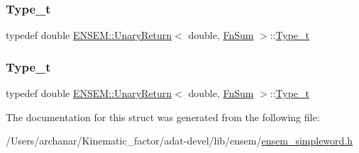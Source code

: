 \mbox{\label{structENSEM_1_1UnaryReturn_3_01double_00_01FnSum_01_4_ad107c064fb27f30146a624a7378978bb}} 
\subsubsection{\texorpdfstring{Type\_t}{Type\_t}\hspace{0.1cm}{\footnotesize\ttfamily [2/3]}}
{\footnotesize\ttfamily typedef double \mbox{\hyperlink{structENSEM_1_1UnaryReturn}{E\+N\+S\+E\+M\+::\+Unary\+Return}}$<$ double, \mbox{\hyperlink{structENSEM_1_1FnSum}{Fn\+Sum}} $>$\+::\mbox{\hyperlink{structENSEM_1_1UnaryReturn_3_01double_00_01FnSum_01_4_ad107c064fb27f30146a624a7378978bb}{Type\+\_\+t}}}

\mbox{\label{structENSEM_1_1UnaryReturn_3_01double_00_01FnSum_01_4_ad107c064fb27f30146a624a7378978bb}} 
\subsubsection{\texorpdfstring{Type\_t}{Type\_t}\hspace{0.1cm}{\footnotesize\ttfamily [3/3]}}
{\footnotesize\ttfamily typedef double \mbox{\hyperlink{structENSEM_1_1UnaryReturn}{E\+N\+S\+E\+M\+::\+Unary\+Return}}$<$ double, \mbox{\hyperlink{structENSEM_1_1FnSum}{Fn\+Sum}} $>$\+::\mbox{\hyperlink{structENSEM_1_1UnaryReturn_3_01double_00_01FnSum_01_4_ad107c064fb27f30146a624a7378978bb}{Type\+\_\+t}}}



The documentation for this struct was generated from the following file\+:\begin{DoxyCompactItemize}
\item 
/\+Users/archanar/\+Kinematic\+\_\+factor/adat-\/devel/lib/ensem/\mbox{\hyperlink{adat-devel_2lib_2ensem_2ensem__simpleword_8h}{ensem\+\_\+simpleword.\+h}}\end{DoxyCompactItemize}
